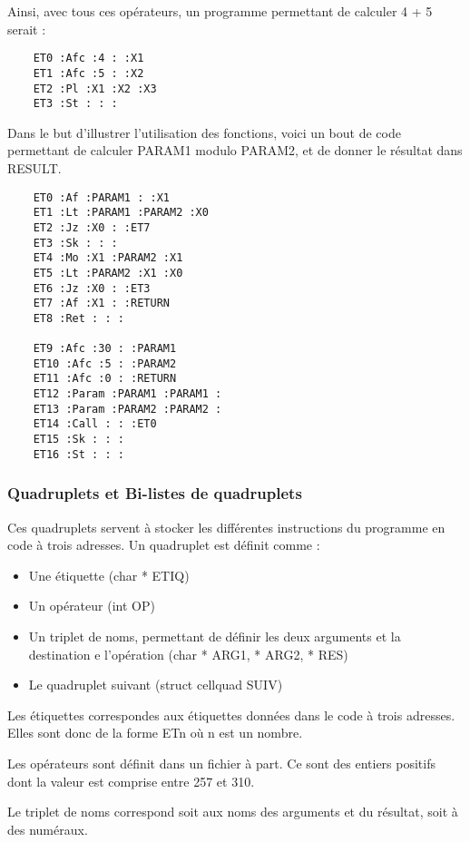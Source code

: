 \documentclass{article}
\begin{document}
\newpage

Ainsi, avec tous ces opérateurs, un programme permettant de calculer 4 + 5 serait :
\begin{lstlisting}
    ET0 :Afc :4 : :X1
    ET1 :Afc :5 : :X2
    ET2 :Pl :X1 :X2 :X3
    ET3 :St : : :
\end{lstlisting}

Dans le but d'illustrer l'utilisation des fonctions, voici un bout de code permettant de calculer PARAM1 modulo PARAM2, et de donner le résultat dans RESULT.

\begin{lstlisting}
    ET0 :Af :PARAM1 : :X1
    ET1 :Lt :PARAM1 :PARAM2 :X0
    ET2 :Jz :X0 : :ET7
    ET3 :Sk : : :
    ET4 :Mo :X1 :PARAM2 :X1
    ET5 :Lt :PARAM2 :X1 :X0
    ET6 :Jz :X0 : :ET3
    ET7 :Af :X1 : :RETURN
    ET8 :Ret : : :

    ET9 :Afc :30 : :PARAM1
    ET10 :Afc :5 : :PARAM2
    ET11 :Afc :0 : :RETURN
    ET12 :Param :PARAM1 :PARAM1 :
    ET13 :Param :PARAM2 :PARAM2 :
    ET14 :Call : : :ET0
    ET15 :Sk : : :
    ET16 :St : : :
\end{lstlisting}

\subsubsection{Quadruplets et Bi-listes de quadruplets}

Ces quadruplets servent à stocker les différentes instructions du programme en code à trois adresses. Un quadruplet est définit comme :

\begin{itemize}
\item Une étiquette (char * ETIQ)
\item Un opérateur (int OP)
\item Un triplet de noms, permettant de définir les deux arguments et la destination e l'opération (char * ARG1, * ARG2, * RES)
\item Le quadruplet suivant (struct cellquad SUIV)
\end{itemize}

Les étiquettes correspondes aux étiquettes données dans le code à trois adresses. Elles sont donc de la forme ETn où n est un nombre.

Les opérateurs sont définit dans un fichier à part. Ce sont des entiers positifs dont la valeur est comprise entre 257 et 310.

Le triplet de noms correspond soit aux noms des arguments et du résultat, soit à des numéraux.
\end{document}
